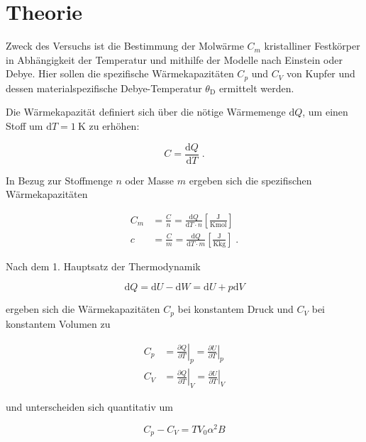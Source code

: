 \section{Theorie}
\label{sec:Theorie}

Zweck des Versuchs ist die Bestimmung der Molwärme $C_m$ kristalliner Festkörper in Abhängigkeit der Temperatur
und mithilfe der Modelle nach Einstein oder Debye. Hier sollen die spezifische Wärmekapazitäten $C_p$ und $C_V$ von Kupfer
und dessen materialspezifische Debye-Temperatur $\theta_\text{D}$ ermittelt werden.

Die Wärmekapazität definiert sich über die nötige Wärmemenge $\text{d}Q$, um einen Stoff um $\text{d}T = \SI{1}{\kelvin}$
zu erhöhen:

\begin{equation}
    C = \frac{\text{d}Q}{\text{d}T} \; .
\end{equation}

In Bezug zur Stoffmenge $n$ oder Masse $m$ ergeben sich die spezifischen Wärmekapazitäten

\begin{align}
    C_m &= \frac{C}{n} = \frac{\text{d}Q}{\text{d}T \cdot n} \left[\frac{\si{\joule}}{\si{\kelvin\mol}}\right] \\
    c &= \frac{C}{m} = \frac{\text{d}Q}{\text{d}T \cdot m} \left[\frac{\si{\joule}}{\si{\kelvin\kilo\gram}}\right] \; .
\end{align}

Nach dem 1. Hauptsatz der Thermodynamik 

\begin{equation}
 \text{d}Q = \text{d}U - \text{d}W = \text{d}U + p\text{d}V
\end{equation}

ergeben sich die Wärmekapazitäten $C_p$ bei konstantem Druck und $C_V$ bei konstantem Volumen zu 

\begin{align}
    C_p &= \left. \frac{\partial Q}{\partial T}\right|_p = \left. \frac{\partial U}{\partial T}\right|_p \\
    C_V &= \left. \frac{\partial Q}{\partial T}\right|_V = \left. \frac{\partial U}{\partial T}\right|_V
\end{align}

und unterscheiden sich quantitativ um

\begin{equation}
    C_p - C_V = T V_0 \alpha^2 B
    \label{eqn:Umrechnung}
\end{equation}

